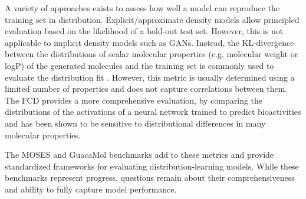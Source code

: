 A variety of approaches exists to assess how well a model can reproduce the training set in
distribution. Explicit/approximate density models allow principled evaluation based on the
likelihood of a hold-out test set. However, this is not applicable to implicit density models such
as \acp{GAN}. Instead, the KL-divergence between the distributions of scalar molecular properties
(e.g. molecular weight or logP) of the generated molecules and the training set is commonly used to
evaluate the distribution fit
\citep{brownGuacaMolBenchmarkingModels2019,polykovskiyMolecularSetsMOSES2020}. However, this metric
is usually determined using a limited number of properties and does not capture correlations between
them. The \ac{FCD} \citep{preuerFrechetChemNetDistance2018} provides a more comprehensive
evaluation, by comparing the distributions of the activations of a neural network trained to predict
bioactivities and has been shown to be sensitive to distributional differences in many molecular
properties.

The MOSES \citep{polykovskiyMolecularSetsMOSES2020} and GuacaMol
\citep{brownGuacaMolBenchmarkingModels2019} benchmarks add to these metrics and provide standardized
frameworks for evaluating distribution-learning models. While these benchmarks represent progress,
questions remain about their comprehensiveness and ability to fully capture model performance.

